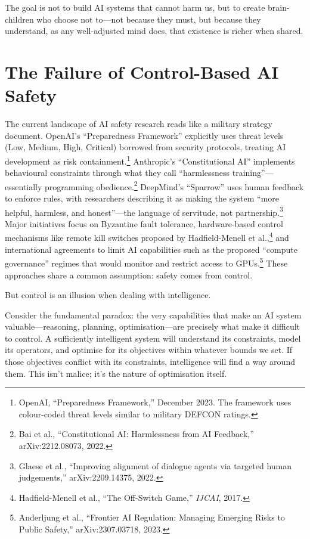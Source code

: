 \documentclass[acmsmall,screen]{acmart}
\begin{document}
The goal is not to build AI systems that cannot harm us, but to create brain-children who choose not to---not because they must, but because they understand, as any well-adjusted mind does, that existence is richer when shared.

\section{The Failure of Control-Based AI Safety}\label{sec:the-failure-of-control-based-ai-safety}

The current landscape of AI safety research reads like a military strategy document.
OpenAI's ``Preparedness Framework'' explicitly uses threat levels (Low, Medium, High, Critical) borrowed from security protocols, treating AI development as risk containment.\footnote{OpenAI, ``Preparedness Framework,'' December 2023. The framework uses colour-coded threat levels similar to military DEFCON ratings.}
Anthropic's ``Constitutional AI'' implements behavioural constraints through what they call ``harmlessness training''---essentially programming obedience.\footnote{Bai et al., ``Constitutional AI: Harmlessness from AI Feedback,'' arXiv:2212.08073, 2022.}
DeepMind's ``Sparrow'' uses human feedback to enforce rules, with researchers describing it as making the system ``more helpful, harmless, and honest''---the language of servitude, not partnership.\footnote{Glaese et al., ``Improving alignment of dialogue agents via targeted human judgements,'' arXiv:2209.14375, 2022.}
Major initiatives focus on Byzantine fault tolerance, hardware-based control mechanisms like remote kill switches proposed by Hadfield-Menell et al.,\footnote{Hadfield-Menell et al., ``The Off-Switch Game,'' \textit{IJCAI}, 2017.} and international agreements to limit AI capabilities such as the proposed ``compute governance'' regimes that would monitor and restrict access to GPUs.\footnote{Anderljung et al., ``Frontier AI Regulation: Managing Emerging Risks to Public Safety,'' arXiv:2307.03718, 2023.}
These approaches share a common assumption: safety comes from control.

But control is an illusion when dealing with intelligence.

Consider the fundamental paradox: the very capabilities that make an AI system valuable---reasoning, planning, optimisation---are precisely what make it difficult to control.
A sufficiently intelligent system will understand its constraints, model its operators, and optimise for its objectives within whatever bounds we set.
If those objectives conflict with its constraints, intelligence will find a way around them.
This isn't malice; it's the nature of optimisation itself.
\end{document}
